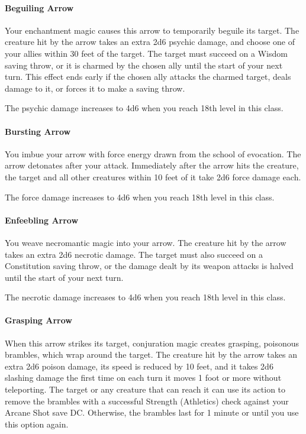 \documentclass[letterpaper,openany,oneside,twocolumn]{book}
\begin{document}
\paragraph{Beguiling Arrow} Your enchantment magic causes this arrow to temporarily beguile its target. The creature hit by the arrow takes an extra 2d6 psychic damage, and choose one of your allies within 30 feet of the target. The target must succeed on a Wisdom saving throw, or it is charmed by the chosen ally until the start of your next turn. This effect ends early if the chosen ally attacks the charmed target, deals damage to it, or forces it to make a saving throw.

The psychic damage increases to 4d6 when you reach 18th level in this class.

\paragraph{Bursting Arrow} You imbue your arrow with force energy drawn from the school of evocation. The arrow detonates after your attack. Immediately after the arrow hits the creature, the target and all other creatures within 10 feet of it take 2d6 force damage each.

The force damage increases to 4d6 when you reach 18th level in this class.

\paragraph{Enfeebling Arrow} You weave necromantic magic into your arrow. The creature hit by the arrow takes an extra 2d6 necrotic damage. The target must also succeed on a Constitution saving throw, or the damage dealt by its weapon attacks is halved until the start of your next turn.

The necrotic damage increases to 4d6 when you reach 18th level in this class.

\paragraph{Grasping Arrow} When this arrow strikes its target, conjuration magic creates grasping, poisonous brambles, which wrap around the target. The creature hit by the arrow takes an extra 2d6 poison damage, its speed is reduced by 10 feet, and it takes 2d6 slashing damage the first time on each turn it moves 1 foot or more without teleporting. The target or any creature that can reach it can use its action to remove the brambles with a successful Strength (Athletics) check against your Arcane Shot save DC. Otherwise, the brambles last for 1 minute or until you use this option again.
\end{document}
